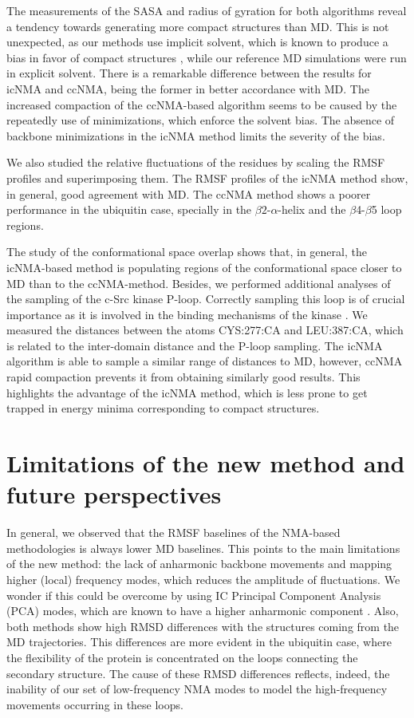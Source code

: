 The measurements of the SASA and radius of gyration for both algorithms reveal a tendency towards generating more compact structures than MD. This is not unexpected, as our methods use implicit solvent, which is known to produce a bias in favor of compact structures \cite{onufriev_exploring_2004, chen_implicit_2008, zhang_residual_2012}, while our reference MD simulations were run in explicit solvent. There is a remarkable difference between the results for icNMA and ccNMA, being the former in better accordance with MD. The increased compaction of the ccNMA-based algorithm seems to be caused by the repeatedly use of minimizations, which enforce the solvent bias. The absence of backbone minimizations in the icNMA method limits the severity of the bias.  

We also studied the relative fluctuations of the residues by scaling the RMSF profiles and superimposing them. The RMSF profiles of the icNMA method show, in general, good agreement with MD. The ccNMA method shows a poorer performance in the ubiquitin case, specially in the $\beta2$-$\alpha$-helix and the $\beta$4-$\beta$5 loop regions. 

The study of the conformational space overlap shows that, in general, the icNMA-based method is populating regions of the conformational space closer to MD than to the ccNMA-method. Besides, we performed additional analyses of the sampling of the c-Src kinase P-loop. Correctly sampling this loop is of crucial importance as it is involved in the binding mechanisms of the kinase \cite{boggon_structure_2004}. We measured the distances between the atoms CYS:277:CA and LEU:387:CA, which is related to the inter-domain distance and the P-loop sampling. The icNMA algorithm is able to sample a similar range of distances to MD, however, ccNMA rapid compaction prevents it from obtaining similarly good results. This highlights the advantage of the icNMA method, which is less prone to get trapped in energy minima corresponding to compact structures.

\section[Limitations and perspectives]{Limitations of the new method and future perspectives}

In general, we observed that the RMSF baselines of the NMA-based methodologies is always lower  MD baselines. This points to the main limitations of the new method: the lack of anharmonic backbone movements and mapping higher (local) frequency modes, which reduces the amplitude of fluctuations. We wonder if this could be overcome by using IC Principal Component Analysis (PCA) modes, which are known to have a higher anharmonic component \cite{hayward_harmonic_1994}. Also, both methods show high RMSD differences with the structures coming from the MD trajectories. This differences are more evident in the ubiquitin case, where the flexibility of the protein is concentrated on the loops connecting the secondary structure. The cause of these RMSD differences reflects, indeed, the inability of our set of low-frequency NMA modes to model the high-frequency movements occurring in these loops. 

